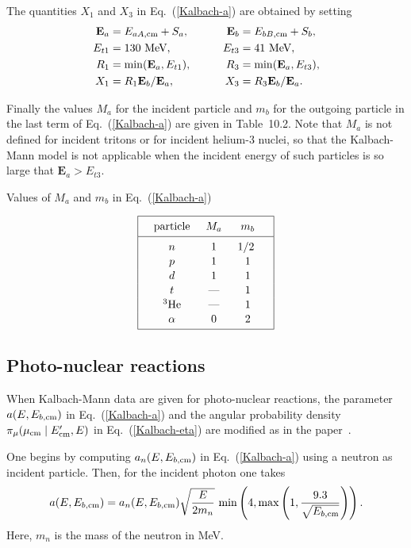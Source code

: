 {The quantities $X_1$ and $X_3$ in Eq.~(\ref{Kalbach-a}) are
obtained by setting
\begin{alignat*}{2}
   \textbf{E}_a &= E_{aA,\text{cm}} + S_a, \qquad
    & \textbf{E}_b &= E_{bB,\text{cm}} + S_b, \\
   E_{t1} &= 130 \text{ MeV}, \qquad
    & E_{t3} &= 41 \text{ MeV}, \\
   R_1 &= \min( \textbf{E}_a, E_{t1}), \qquad
    & R_3 &= \min( \textbf{E}_a, E_{t3}), \\
   X_1 &= R_1 \textbf{E}_b / \textbf{E}_a, \qquad
    & X_3 &= R_3 \textbf{E}_b / \textbf{E}_a.
\end{alignat*}

Finally the values $M_a$ for the incident particle and $m_b$ for the
outgoing particle in the last term of Eq.~(\ref{Kalbach-a}) are
given in Table~10.2.  Note that $M_a$ is not defined for incident
tritons or for incident helium-3 nuclei, so that the Kalbach-Mann
model is not applicable when the incident energy of such 
particles is so large that $\textbf{E}_a > E_{t3}$.

\begin{table}
\caption{Values of $M_a$ and $m_b$ in Eq.~(\ref{Kalbach-a})}
$$
 \vbox{ \offinterlineskip \tabskip = 0.0cm
  \halign{
   \mystrut#\hfil  \tabskip = 0.5cm &
   \hfil#\hfil&
   \hfil#\hfil&
   \hfil#\hfil&  \tabskip = 0cm
   \hfil\vrule#\cr
   \noalign{\hrule}
   height 12pt depth 6pt& particle&  $M_a$& $m_b$& \cr
   \noalign{\hrule}
   height 12pt& $n$& 1& 1/2 &\cr
   &$p$& 1& 1&\cr
   &$d$& 1& 1& \cr
   &$t$& ---& 1& \cr
   &${}^3\text{He}$& ---& 1&\cr
   depth 6pt &$\alpha$& 0& 2& \cr
   \noalign{\hrule}
  }
 }
$$
\end{table}

\subsection{Photo-nuclear reactions}
When Kalbach-Mann data are given for photo-nuclear reactions, 
the parameter $a(E, E_{b,\text{cm}})$ in Eq.~(\ref{Kalbach-a}) and the
angular probability density $\pi_\mu( \mu_{\text{cm}} \mid E_{\text{cm}}', E )$
in Eq.~(\ref{Kalbach-eta}) are modified as in the paper~\cite{photo-nuc}.

One begins by computing $a_n(E, E_{b,\text{cm}})$ in Eq.~(\ref{Kalbach-a}) using a neutron as
incident particle.  Then, for the incident photon one takes
\begin{equation}
  a(E, E_{b,\text{cm}}) = a_n(E, E_{b,\text{cm}})
    \sqrt{ \frac{E}{2 m_n} } \,
    \min\left(
      4, \max\left(
        1, \frac{9.3}{\sqrt{E_{b,\text{cm}}}}
      \right)
    \right).
 \label{Kalbach-photo}
\end{equation}
Here, $m_n$ is the mass of the neutron in MeV.

}
